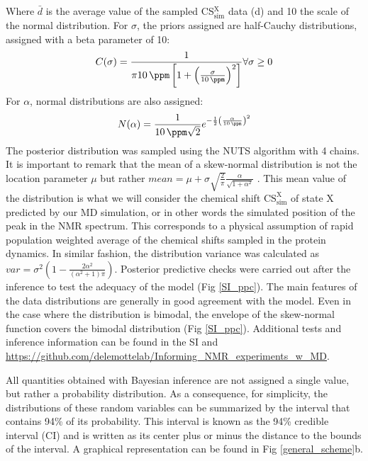 \documentclass[%
 aip,
 amsmath,amssymb,
 preprint,%
]{revtex4-1}
\begin{document}
Where $\bar{d}$ is the average value of the sampled CS$_\text{sim}^\text{X}$ data (d) and \SI{10}{\ppm} the scale of the normal distribution. 
For $\sigma$, the priors assigned are half-Cauchy distributions, assigned with a beta parameter of \SI{10}{\ppm}:
\begin{equation}
    C(\sigma)=\frac{1}
    {\pi\SI{10}{\ppm}\left[ 
    1+\left(
    \frac{\sigma}{\SI{10}{\ppm}}
    \right)^2\right]
    }
    \forall \sigma \geq 0
\end{equation}
For $\alpha$, normal distributions are also assigned:
\begin{equation}
    N(\alpha)=\frac{1}{\SI{10}{\ppm}\sqrt{2}}e^{-\frac{1}{2}\left(
    \frac{\alpha}{\SI{10}{\ppm}}
    \right)^2}
\end{equation}
The posterior distribution was sampled using the NUTS\cite{sanjeevi2017nuts} algorithm with 4 chains. It is important to remark that the mean of a skew-normal distribution is not the location parameter $\mu$ but rather $mean = \mu + \sigma\sqrt{\frac{2}{\pi}}\frac{\alpha}{\sqrt{1+\alpha^2}}$ . This mean value of the distribution is what we will consider the chemical shift $\text{CS}_{\text{sim}}^{\text{X}}$ of state X predicted by our MD simulation, or in other words the simulated position of the peak in the NMR spectrum. This corresponds to a physical assumption of rapid population weighted average of the chemical shifts sampled in the protein dynamics. In similar fashion, the distribution variance was calculated as $var = \sigma^2\left(1-\frac{2\alpha^2}{\left(\alpha^2+1\right)\pi}\right)$. Posterior predictive checks were carried out after the inference to test the adequacy of the model (Fig \ref{SI_ppc}). The main features of the data distributions are generally in good agreement with the model. Even in the case where the distribution is bimodal, the envelope of the skew-normal function covers the bimodal distribution (Fig \ref{SI_ppc}).  Additional tests and inference information can be found in the SI and \url{https://github.com/delemottelab/Informing_NMR_experiments_w_MD}. 

All quantities obtained with Bayesian inference are not assigned a single value, but rather a probability distribution. As a consequence, for simplicity, the distributions of these random variables can be summarized by the interval that contains 94\% of its probability. This interval is known as the 94\% credible interval (CI) and is written as its center plus or minus the distance to the bounds of the interval. A graphical representation can be found in Fig \ref{general_scheme}b. 
\end{document}
